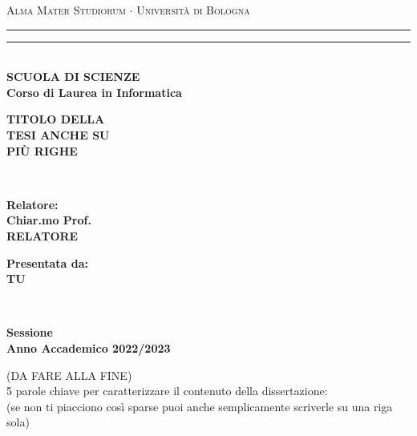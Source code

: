 \documentclass[12pt,a4paper,twoside]{book}
\newcommand{\rom}[1]{\uppercase\expandafter{\romannumeral #1\relax}}
\begin{document}
\pagestyle{empty}
\begin{titlepage}
\begin{center}
    {{\Large{\textsc{Alma Mater Studiorum $\cdot$ Università di Bologna}}}}
    \rule[0.1cm]{\textwidth}{0.1mm}
    \rule[0.5cm]{\textwidth}{0.6mm}\\
    {\small{\bf SCUOLA DI SCIENZE\\
    Corso di Laurea in Informatica}}
\end{center}

\vspace{25mm}

\begin{center}
    {\LARGE{\bf TITOLO DELLA }}\\
    \vspace{3mm}
    {\LARGE{\bf TESI ANCHE SU}}\\
    \vspace{3mm}
    {\LARGE{\bf PIÙ RIGHE}}\\
\end{center}

\vspace{60mm}
\par
\noindent
\begin{minipage}[t]{0.04\textwidth}
~
\end{minipage}
\begin{minipage}[t]{0.4\textwidth}
{\large{\bf Relatore:\\
Chiar.mo Prof.\\
RELATORE}}
\end{minipage}
\hfill
\begin{minipage}[t]{0.4\textwidth}\raggedleft
{\large{\bf Presentata da:\\
TU}}
\end{minipage}
\begin{minipage}[t]{0.04\textwidth}
~
\end{minipage}

\vspace{30mm}

\begin{center}
    {\large{\bf \rom{1} Sessione\\
    Anno Accademico 2022/2023 }}
\end{center}
\end{titlepage}

\restoregeometry
\newpage
\begin{center}
    (DA FARE ALLA FINE)\\
    5 parole chiave per caratterizzare il contenuto della dissertazione:\\ (se non ti piacciono così sparse puoi anche semplicamente scriverle su una riga sola)
\end{center}
\end{document}
